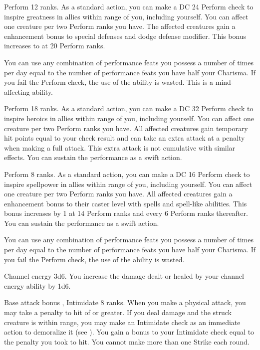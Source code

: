 \featpre Perform 12 ranks.
\featben As a standard action, you can make a DC 24 Perform check to inspire greatness in allies within \rngmed range of you, including yourself. You can affect one creature per two Perform ranks you have. The affected creatures gain a  enhancement bonus to special defenses and dodge defense modifier. This bonus increases to  at 20 Perform ranks.

You can use any combination of performance feats you possess a number of times per day equal to the number of performance feats you have \add half your Charisma. If you fail the Perform check, the use of the ability is wasted. This is a mind-affecting ability.

\featpre Perform 18 ranks.
\featben As a standard action, you can make a DC 32 Perform check to inspire heroics in allies within \rngmed range of you, including yourself. You can affect one creature per two Perform ranks you have. All affected creatures gain temporary hit points equal to your check result and can take an extra attack at a  penalty when making a full attack. This extra attack is not cumulative with similar effects. You can sustain the performance as a swift action.

\featpre Perform 8 ranks.
\featben As a standard action, you can make a DC 16 Perform check to inspire spellpower in allies within \rngmed range of you, including yourself. You can affect one creature per two Perform ranks you have. All affected creatures gain a  enhancement bonus to their caster level with spells and spell-like abilities. This bonus increases by 1 at 14 Perform ranks and every 6 Perform ranks thereafter. You can sustain the performance as a swift action.

You can use any combination of performance feats you possess a number of times per day equal to the number of performance feats you have \add half your Charisma. If you fail the Perform check, the use of the ability is wasted.

 Channel energy 3d6.
 You increase the damage dealt or healed by your channel energy ability by 1d6.

\featpres Base attack bonus , Intimidate 8 ranks.
\featben When you make a physical attack, you may take a penalty to hit of  or greater. If you deal damage and the struck creature is within \rngmed range, you may make an Intimidate check as an immediate action to demoralize it (see ). You gain a bonus to your Intimidate check equal to the penalty you took to hit. You cannot make more than one Strike each round.

